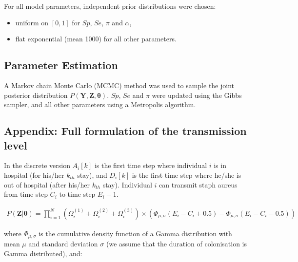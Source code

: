 \documentclass[10pt]{article}
\begin{document}

For all model parameters, independent prior distributions were chosen: 
\begin{itemize}
	\item uniform on $[0,1]$ for $Sp$, $Se$, $\pi$ and $\alpha$, 
	\item flat exponential (mean 1000) for all other parameters. 
\end{itemize}

  
\subsection*{Parameter Estimation}

A Markov chain Monte Carlo (MCMC) method was used to sample the joint
posterior distribution $P\left(\bm{Y},\bm{Z},\bm{\theta}\right)$.
$Sp$, $Se$ and $\pi$ were updated using the Gibbs sampler, and all other parameters using a Metropolis algorithm.


\subsection*{Appendix: Full formulation of the transmission level}

In the discrete version $A_i[k]$ is the first time step where individual $i$ is in hospital (for his/her $k_{th}$ stay), and $D_i[k]$ is the first time step where he/she is out of hospital (after his/her $k_{th}$ stay). Individual $i$ can transmit staph aureus from time step $C_i$ to time step $E_i-1$. 

\begin{eqnarray*}
P\left(\bm{Z}|\bm{\theta}\right) = 
\bm{\prod}_{i=1}^N %
\left( \Omega_i^{\left(1\right)} + \Omega_i^{\left(2\right)} + \Omega_i^{\left(3\right)} \right) \times \left(\Phi_{\mu,\sigma}\left(E_i-C_i+0.5\right) - \Phi_{\mu,\sigma}\left(E_i-C_i-0.5\right) \right)
\end{eqnarray*}

\noindent where $\Phi_{\mu,\sigma}$ is the cumulative density function of a Gamma distribution with mean $\mu$ and standard deviation $\sigma$ (we assume that the duration of colonisation is Gamma distributed), and: 
\end{document}
